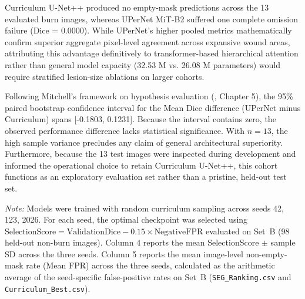 \documentclass[11pt,a4paper]{article}
\begin{document}
Curriculum U-Net++ produced no empty-mask predictions across the 13 evaluated burn images, whereas UPerNet MiT-B2 suffered one complete omission failure (Dice = 0.0000). While UPerNet's higher pooled metrics mathematically confirm superior aggregate pixel-level agreement across expansive wound areas, attributing this advantage definitively to transformer-based hierarchical attention rather than general model capacity (32.53 M vs. 26.08 M parameters) would require stratified lesion-size ablations on larger cohorts.

Following Mitchell's framework on hypothesis evaluation (\cite{mitchell1997}, Chapter 5), the 95\% paired bootstrap confidence interval for the Mean Dice difference (UPerNet minus Curriculum) spans [-0.1803, 0.1231]. Because the interval contains zero, the observed performance difference lacks statistical significance. With $n = 13$, the high sample variance precludes any claim of general architectural superiority. Furthermore, because the 13 test images were inspected during development and informed the operational choice to retain Curriculum U-Net++, this cohort functions as an exploratory evaluation set rather than a pristine, held-out test set.

\begin{table}[htbp]
\centering
\caption{Segmentation candidate performance in model selection round across three random seeds on validation data.}
\label{tab:table9}
\small
{}
\vspace{0.3ex}
\flushleft
\footnotesize\textit{Note:} Models were trained with random curriculum sampling across seeds 42, 123, 2026. For each seed, the optimal checkpoint was selected using $\text{SelectionScore} = \text{ValidationDice} - 0.15 \times \text{NegativeFPR}$ evaluated on Set~B (98 held-out non-burn images). Column 4 reports the mean SelectionScore $\pm$ sample SD across the three seeds. Column 5 reports the mean image-level non-empty-mask rate (Mean FPR) across the three seeds, calculated as the arithmetic average of the seed-specific false-positive rates on Set~B (\texttt{SEG\_Ranking.csv} and \texttt{Curriculum\_Best.csv}).
\end{table}
\end{document}

